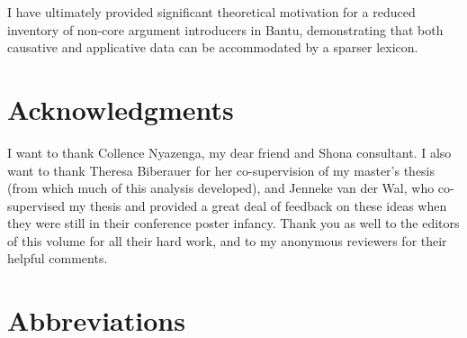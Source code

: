 \documentclass[output=paper,modfonts,nonflat]{langsci/langscibook}
\begin{document}
I have ultimately provided significant theoretical motivation for a reduced inventory of non-core argument introducers in Bantu, demonstrating that both causative and applicative data can be accommodated by a sparser lexicon. 


\section{Acknowledgments}

I want to thank Collence Nyazenga, my dear friend and Shona consultant. I also want to thank Theresa Biberauer for her co-supervision of my master’s thesis (from which much of this analysis developed), and Jenneke van der Wal, who co-supervised my thesis and provided a great deal of feedback on these ideas when they were still in their conference poster infancy. Thank you as well to the editors of this volume for all their hard work, and to my anonymous reviewers for their helpful comments.  

\section{Abbreviations}

\begin{styleBody}
\end{styleBody}
\end{document}
